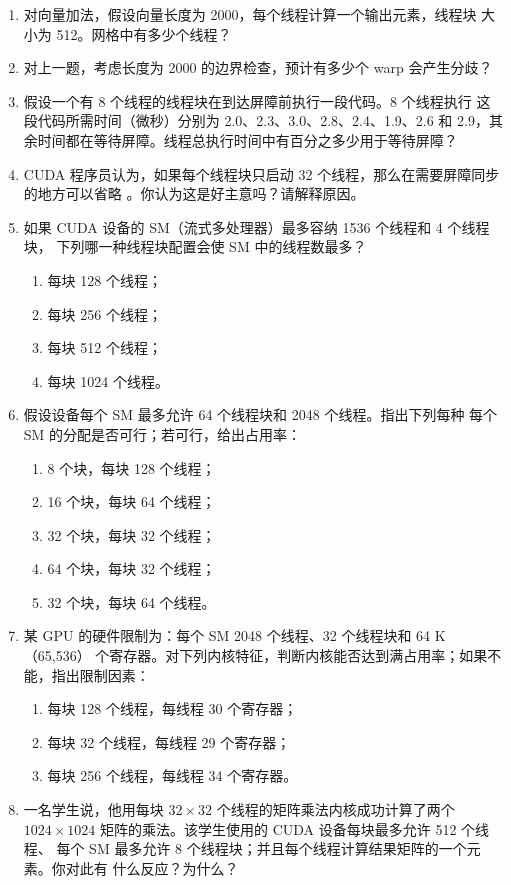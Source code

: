 \begin{enumerate}[label=\arabic*.,leftmargin=2.7em]
  \item 对向量加法，假设向量长度为 2000，每个线程计算一个输出元素，线程块
  大小为 512。网格中有多少个线程？

  \item 对上一题，考虑长度为 2000 的边界检查，预计有多少个 warp 会产生分歧？

  \item 假设一个有 8 个线程的线程块在到达屏障前执行一段代码。8 个线程执行
  这段代码所需时间（微秒）分别为 2.0、2.3、3.0、2.8、2.4、1.9、2.6 和
  2.9，其余时间都在等待屏障。线程总执行时间中有百分之多少用于等待屏障？

  \item CUDA 程序员认为，如果每个线程块只启动 32 个线程，那么在需要屏障同步
  的地方可以省略 。你认为这是好主意吗？请解释原因。

  \item 如果 CUDA 设备的 SM（流式多处理器）最多容纳 1536 个线程和 4 个线程块，
  下列哪一种线程块配置会使 SM 中的线程数最多？
  \begin{enumerate}[label=\alph*.,leftmargin=2.2em]
    \item 每块 128 个线程；
    \item 每块 256 个线程；
    \item 每块 512 个线程；
    \item 每块 1024 个线程。
  \end{enumerate}

  \item 假设设备每个 SM 最多允许 64 个线程块和 2048 个线程。指出下列每种
  每个 SM 的分配是否可行；若可行，给出占用率：
  \begin{enumerate}[label=\alph*.,leftmargin=2.2em]
    \item 8 个块，每块 128 个线程；
    \item 16 个块，每块 64 个线程；
    \item 32 个块，每块 32 个线程；
    \item 64 个块，每块 32 个线程；
    \item 32 个块，每块 64 个线程。
  \end{enumerate}

  \item 某 GPU 的硬件限制为：每个 SM 2048 个线程、32 个线程块和 64 K（65,536）
  个寄存器。对下列内核特征，判断内核能否达到满占用率；如果不能，指出限制因素：
  \begin{enumerate}[label=\alph*.,leftmargin=2.2em]
    \item 每块 128 个线程，每线程 30 个寄存器；
    \item 每块 32 个线程，每线程 29 个寄存器；
    \item 每块 256 个线程，每线程 34 个寄存器。
  \end{enumerate}

  \item 一名学生说，他用每块 $32\times32$ 个线程的矩阵乘法内核成功计算了两个
  $1024\times1024$ 矩阵的乘法。该学生使用的 CUDA 设备每块最多允许 512 个线程、
  每个 SM 最多允许 8 个线程块；并且每个线程计算结果矩阵的一个元素。你对此有
  什么反应？为什么？
\end{enumerate}

